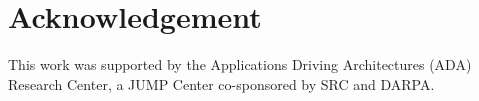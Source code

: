 \vspace{-0.25cm}
\section{Acknowledgement}
This work was supported by the Applications Driving Architectures (ADA) Research Center, a JUMP Center co-sponsored by SRC and DARPA.